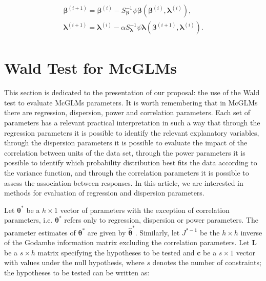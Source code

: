 \documentclass[USenglish]{article}
\theoremstyle{dgthm}
\theoremstyle{dgdef}
\begin{document}
$$
\begin{aligned}
\begin{matrix}
\boldsymbol{\beta}^{(i+1)} = \boldsymbol{\beta}^{(i)}- S_{\boldsymbol{\beta}}^{-1} \psi \boldsymbol{\beta} (\boldsymbol{\beta}^{(i)}, \boldsymbol{\lambda}^{(i)}), \\ 
\boldsymbol{\lambda}^{(i+1)} = \boldsymbol{\lambda}^{(i)} - \alpha S_{\boldsymbol{\lambda}}^{-1} \psi \boldsymbol{\lambda} (\boldsymbol{\beta}^{(i+1)}, \boldsymbol{\lambda}^{(i)}).
\end{matrix}
\end{aligned}
$$


\section{Wald Test for McGLMs}\label{sec4}

This section is dedicated to the presentation of our proposal: the use of the Wald test to evaluate McGLMs parameters. It is worth remembering that in McGLMs there are regression, dispersion, power and correlation parameters. Each set of parameters has a relevant practical interpretation in such a way that through the regression parameters it is possible to identify the relevant explanatory variables, through the dispersion parameters it is possible to evaluate the impact of the correlation between units of the data set, through the power parameters it is possible to identify which probability distribution best fits the data according to the variance function, and through the correlation parameters it is possible to assess the association between responses. In this article, we are interested in methods for evaluation of regression and dispersion parameters.


Let $\boldsymbol{\theta^{*}}$ be a $h \times 1$ vector of parameters with the exception of correlation parameters, i.e. $\boldsymbol{\theta^{*}}$ refers only to regression, dispersion or power parameters. 
The parameter estimates of $\boldsymbol{\theta^{*}}$ are given by $\boldsymbol{\hat\theta^{*}}$. Similarly, let $J^{\boldsymbol{*}-1}$ be the $h \times h$ inverse of the Godambe information matrix excluding the correlation parameters. Let $\boldsymbol{L}$ be a $s \times h$ matrix specifying the hypotheses to be tested and $\boldsymbol{c}$ be a $s \times 1$ vector with values under the null hypothesis, where $s$ denotes the number of constraints; the hypotheses to be tested can be written as:
\end{document}
